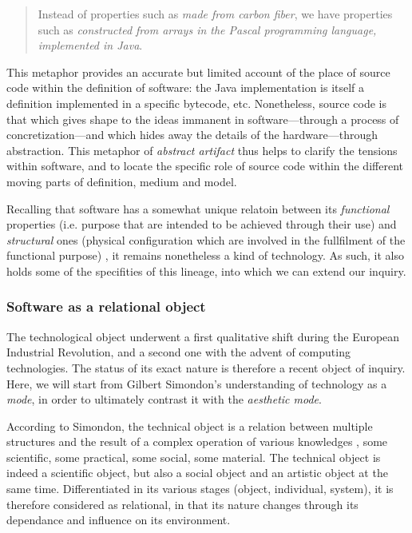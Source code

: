 \begin{quote}
    Instead of properties such as \emph{made from carbon fiber}, we have properties such as \emph{constructed from arrays in the Pascal programming language, implemented in Java}. \citep{turner_computational_2018}
\end{quote}

This metaphor provides an accurate but limited account of the place of source code within the definition of software: the Java implementation is itself a definition implemented in a specific bytecode, etc. Nonetheless, source code is that which gives shape to the ideas immanent in software—through a process of concretization—and which hides away the details of the hardware—through abstraction. This metaphor of \emph{abstract artifact} thus helps to clarify the tensions within software, and to locate the specific role of source code within the different moving parts of definition, medium and model.

Recalling that software has a somewhat unique relatoin between its \emph{functional} properties (i.e. purpose that are intended to be achieved through their use) and \emph{structural} ones (physical configuration which are involved in the fullfilment of the functional purpose) \citep{turner_computational_2018}, it remains nonetheless a kind of technology. As such, it also holds some of the specifities of this lineage, into which we can extend our inquiry.

\subsubsection{Software as a relational object}
\label{subsubsec:software-relational}

The technological object underwent a first qualitative shift during the European Industrial Revolution, and a second one with the advent of computing technologies. The status of its exact nature is therefore a recent object of inquiry. Here, we will start from Gilbert Simondon's understanding of technology as a \emph{mode}, in order to ultimately contrast it with the \emph{aesthetic mode}.

According to Simondon, the technical object is a relation between multiple structures and the result of a complex operation of various knowledges \citep{simondon_mode_1958}, some scientific, some practical, some social, some material. The technical object is indeed a scientific object, but also a social object and an artistic object at the same time. Differentiated in its various stages (object, individual, system), it is therefore considered as relational, in that its nature changes through its dependance and influence on its environment.

